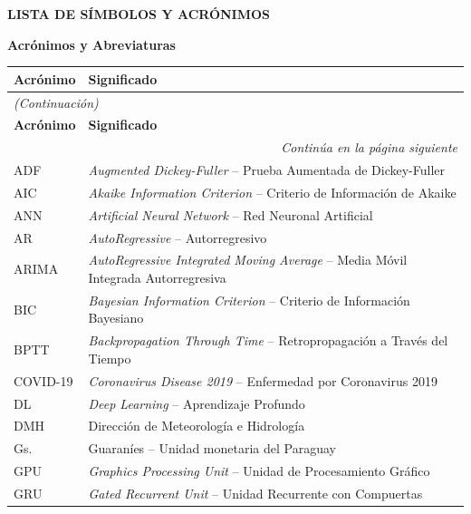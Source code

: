 \noindent
\textbf{\large LISTA DE SÍMBOLOS Y ACRÓNIMOS}

\vspace{0.4cm}

\noindent\textbf{Acrónimos y Abreviaturas}

\vspace{0.25cm}

\noindent
\begin{longtable}{p{3.2cm} p{10.8cm}}
\toprule
\textbf{Acrónimo} & \textbf{Significado} \\
\midrule
\endfirsthead
\multicolumn{2}{l}{\small\textit{(Continuación)}} \\[2pt]
\toprule
\textbf{Acrónimo} & \textbf{Significado} \\
\midrule
\endhead
\midrule
\multicolumn{2}{r}{\small\textit{Continúa en la página siguiente}} \\
\endfoot
\bottomrule
\endlastfoot
ADF     & \textit{Augmented Dickey-Fuller} -- Prueba Aumentada de Dickey-Fuller \\[3pt]
AIC     & \textit{Akaike Information Criterion} -- Criterio de Información de Akaike \\[3pt]
ANN     & \textit{Artificial Neural Network} -- Red Neuronal Artificial \\[3pt]
AR      & \textit{AutoRegressive} -- Autorregresivo \\[3pt]
ARIMA   & \textit{AutoRegressive Integrated Moving Average} -- Media Móvil Integrada Autorregresiva \\[3pt]
BIC     & \textit{Bayesian Information Criterion} -- Criterio de Información Bayesiano \\[3pt]
BPTT    & \textit{Backpropagation Through Time} -- Retropropagación a Través del Tiempo \\[3pt]
COVID-19 & \textit{Coronavirus Disease 2019} -- Enfermedad por Coronavirus 2019 \\[3pt]
DL      & \textit{Deep Learning} -- Aprendizaje Profundo \\[3pt]
DMH     & Dirección de Meteorología e Hidrología \\[3pt]
Gs.     & Guaraníes -- Unidad monetaria del Paraguay \\[3pt]
GPU     & \textit{Graphics Processing Unit} -- Unidad de Procesamiento Gráfico \\[3pt]
GRU     & \textit{Gated Recurrent Unit} -- Unidad Recurrente con Compuertas \\[3pt]

\end{longtable}
